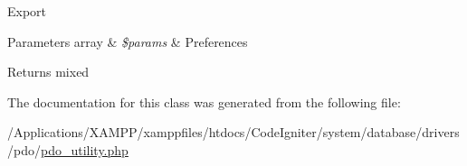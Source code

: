 Export


\begin{DoxyParams}[1]{Parameters}
array & {\em \$params} & Preferences \\
\hline
\end{DoxyParams}
\begin{DoxyReturn}{Returns}
mixed 
\end{DoxyReturn}


The documentation for this class was generated from the following file\+:\begin{DoxyCompactItemize}
\item 
/\+Applications/\+X\+A\+M\+P\+P/xamppfiles/htdocs/\+Code\+Igniter/system/database/drivers/pdo/\mbox{\hyperlink{pdo__utility_8php}{pdo\+\_\+utility.\+php}}\end{DoxyCompactItemize}
